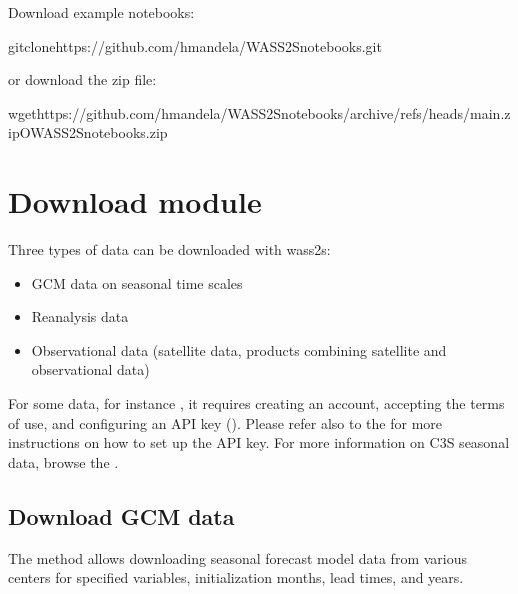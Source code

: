 \documentclass[letterpaper,10pt,english]{sphinxmanual}
\begin{document}
\sphinxAtStartPar
Download example notebooks:

\begin{sphinxVerbatim}[commandchars=\\\{\}]
gitclonehttps://github.com/hmandela/WASS2S\PYGZus{}notebooks.git
\end{sphinxVerbatim}

\sphinxAtStartPar
or download the zip file:

\begin{sphinxVerbatim}[commandchars=\\\{\}]
wgethttps://github.com/hmandela/WASS2S\PYGZus{}notebooks/archive/refs/heads/main.zip\PYGZhy{}OWASS2S\PYGZus{}notebooks.zip
\end{sphinxVerbatim}

\sphinxstepscope


\section{Download module}
\label{\detokenize{Download:download-module}}\label{\detokenize{Download::doc}}
\sphinxAtStartPar
Three types of data can be downloaded with wass2s:
\begin{itemize}
\item {} 
\sphinxAtStartPar
GCM data on seasonal time scales

\item {} 
\sphinxAtStartPar
Reanalysis data

\item {} 
\sphinxAtStartPar
Observational data (satellite data, products combining satellite and observational data)

\end{itemize}

\sphinxAtStartPar
For some data, for instance , it requires creating an account, accepting the terms of use, and configuring an API key ().
Please refer also to the  for more instructions on how to set up the API key.
For more information on C3S seasonal data, browse the .


\subsection{Download GCM data}
\label{\detokenize{Download:download-gcm-data}}
\sphinxAtStartPar
The  method allows downloading seasonal forecast model data from various centers for specified variables, initialization months, lead times, and years.
\end{document}
